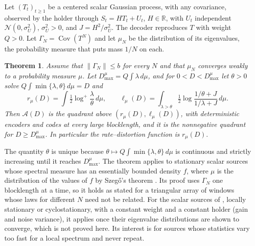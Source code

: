 \documentclass[11pt,onecolumn]{IEEEtran}
\newtheorem{theorem}{Theorem}
\newcommand{\R}{\mathbb{R}}
\newcommand{\Cov}{\operatorname{Cov}}
\begin{document}
Let $(T_t)_{t\ge1}$ be a centered scalar Gaussian process, with any
covariance, observed by the holder through $S_t=HT_t+U_t$, $H\in\R$, with
$U_t$ independent $\mathcal N(0,\sigma_U^2)$, $\sigma_U^2>0$, and
$J=H^2/\sigma_U^2$. The
decoder reproduces $T$ with weight $Q>0$. Let $\Gamma_N=\Cov(T^N)$ and
let $\mu_N$ be the distribution of its eigenvalues, the probability
measure that puts mass $1/N$ on each.

\begin{theorem}\label{thm:law}
Assume that $\|\Gamma_N\|\le b$ for every $N$ and that $\mu_N$ converges
weakly to a probability measure $\mu$. Let $D_{\max}^\mu=Q\int\lambda\,d\mu$,
and for $0<D<D_{\max}^\mu$ let $\theta>0$ solve
$Q\int\min\{\lambda,\theta\}\,d\mu=D$ and
\[
r_\mu(D)=\int\tfrac12\log^+\frac\lambda\theta\,d\mu,\qquad
\ell_\mu(D)=\int_{\lambda>\theta}\tfrac12\log\frac{1/\theta+J}{1/\lambda+J}\,d\mu .
\]
Then $\mathcal A(D)$ is the quadrant above $(r_\mu(D),\ell_\mu(D))$, with
deterministic encoders and codes at every large blocklength, and it is
the nonnegative quadrant for $D\ge D_{\max}^\mu$. In particular the
rate--distortion function is $r_\mu(D)$.
\end{theorem}

The quantity $\theta$ is unique because
$\theta\mapsto Q\int\min\{\lambda,\theta\}\,d\mu$ is continuous and
strictly increasing until it reaches $D_{\max}^\mu$. The theorem applies
to stationary scalar sources whose spectral measure has an essentially
bounded density $f$, where $\mu$ is the distribution of the values of
$f$ by Szeg\H{o}'s theorem \cite{grenander1958}. Its proof uses
$\Gamma_N$ one blocklength at a time, so it holds as stated for a
triangular array of windows whose laws for different $N$ need not be
related. For the scalar sources of \cite{part3}, locally stationary or
cyclostationary, with a constant weight and a constant holder (gain and
noise variance), it applies once their eigenvalue distributions are shown to
converge, which is not proved here. Its interest is for sources
whose statistics vary too fast for a local spectrum and never repeat.
\end{document}
